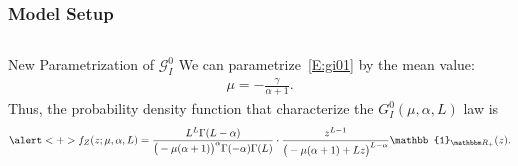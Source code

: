\documentclass[aspectratio=169,10pt]{beamer}
\begin{document}
\begin{frame} \frametitle{\large{Model Setup}}\vspace{0.4cm}	

 \justifying
\begin{columns}[T,onlytextwidth]
    \begin{column}{.99\textwidth}
			\begin{block}{New Parametrization of \(\mathcal{G}_I^0\) }\justifying
			\vspace{0.4cm}
We can parametrize~\eqref{E:gi01} by the mean value: \begin{align*}
    \mu=-\frac{\gamma}{\alpha+1}.
\end{align*} 
\pause
Thus, the probability density function that characterize
the \(G_I^0(\mu, \alpha, L)\) law is \begin{align*}
       \alert<+>{f_Z(z; \mu, \alpha, L)=\frac{L^L\Gamma(L-\alpha)}{\big(-\mu(\alpha+1)\big)^{\alpha}\Gamma(-\alpha)\Gamma(L)}\cdot\frac{z^{L-1}}{\big(-\mu(\alpha+1)+Lz\big)^{L-\alpha}}\mathbb{1}_{\mathbbm R_+}(z)}.
\end{align*}
	\end{block}
	\
		
    \end{column}
    
\end{columns}%
\end{frame} 
\end{document}
